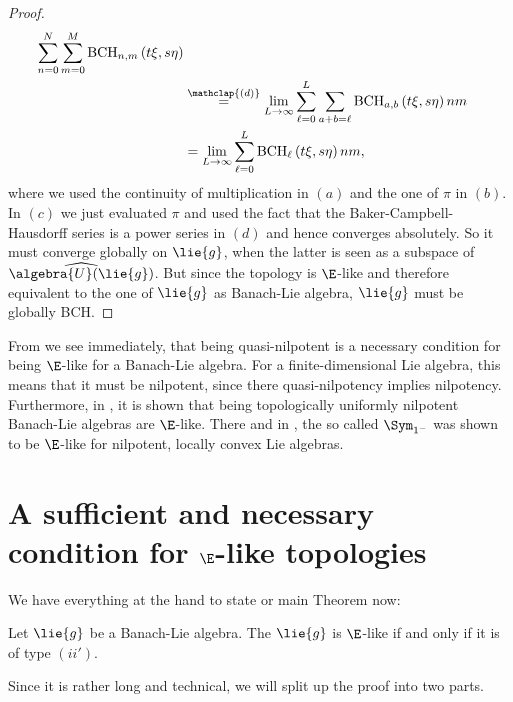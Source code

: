 \documentclass[
11pt,                          %
english                        %
]{article}
\newcommand{\bchpart}[3]{\mathrm{BCH}_{#1}\left(#2, #3\right)}
\newcommand{\bchparts}[4]{\mathrm{BCH}_{#1, #2}\left(#3, #4\right)}
\newcommand\ot[2]{\stackrel{\mathclap{#1}}{#2}}
\begin{document}
\begin{proof}
\begin{align*}
		\sum\limits_{n=0}^{N}
		\sum\limits_{m=0}^{M}
		\bchparts{n}{m}{t \xi}{s \eta}
		\\
		& \ot{(d)}{=}
		\lim_{L \rightarrow \infty}
		\sum\limits_{\ell=0}^{L}
		\sum\limits_{a + b = \ell}
		\bchparts{a}{b}{t \xi}{s \eta}{n}{m}
		\\
		& =
		\lim_{L \rightarrow \infty}
		\sum\limits_{\ell=0}^{L}
		\bchpart{\ell}{t \xi}{s \eta}{n}{m},
	\end{align*}
	where we used the continuity of multiplication in $(a)$ and the one of $\pi$ in 
	$(b)$. In $(c)$ we just evaluated $\pi$ and used the fact that the 
	Baker-Campbell-Hausdorff series is a power series in $(d)$ and hence converges 
	absolutely. So it must converge globally on $\lie{g}$, when the latter is seen 
	as a subspace of $\widehat{\algebra{U}(\lie{g})}$. But since the topology is 
	$\E$-like and therefore equivalent to the one of $\lie{g}$ as Banach-Lie 
	algebra, $\lie{g}$ must be globally BCH.
\end{proof}
From \cite{woj} we see immediately, that being quasi-nilpotent is a necessary 
condition for being $\E$-like for a Banach-Lie algebra. For a finite-dimensional 
Lie algebra, this means that it must be nilpotent, since there quasi-nilpotency 
implies nilpotency. Furthermore, in \cite{stapor:2015a}, it is shown that being 
topologically uniformly nilpotent Banach-Lie algebras are $\E$-like. There and in 
\cite{esposito.stapor.waldmann:2015a:pre}, the so called $\Sym_{1^-}$ was shown to 
be $\E$-like for nilpotent, locally convex Lie algebras.



\section{A sufficient and necessary condition for $\E$-like topologies}
\label{sec:MainProof}

We have everything at the hand to state or main Theorem now:
\begin{theorem}
	\label{Thm:Main}
	Let $\lie{g}$ be a Banach-Lie algebra. The $\lie{g}$ is $\E$-like if and only 
	if it is of type $(ii')$.
\end{theorem}
Since it is rather long and technical, we will split up the proof into two parts.
\end{document}
